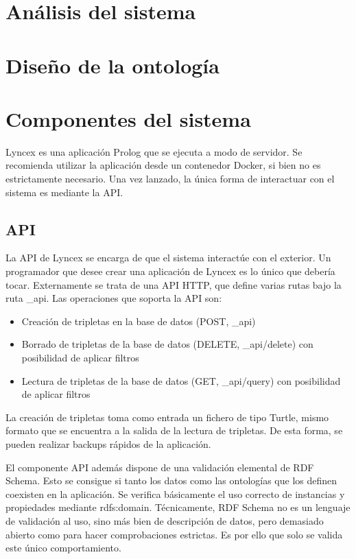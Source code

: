 \documentclass[12pt]{report} %
\begin{document}
\chapter{Análisis del sistema}

\chapter{Diseño de la ontología}

\chapter{Componentes del sistema}
Lyncex es una aplicación Prolog que se ejecuta a modo de servidor. Se recomienda utilizar la aplicación desde un contenedor Docker, si bien no es estrictamente necesario. 
Una vez lanzado, la única forma de interactuar con el sistema es mediante la API.

\section{API}
La API de Lyncex se encarga de que el sistema interactúe con el exterior.
Un programador que desee crear una aplicación de Lyncex es lo único que debería tocar.
Externamente se trata de una API HTTP, que define varias rutas bajo la ruta \_api.
Las operaciones que soporta la API son:
\begin{itemize}
    \item Creación de tripletas en la base de datos (POST, \_api)
    \item Borrado de tripletas de la base de datos (DELETE, \_api/delete) con posibilidad de aplicar filtros
    \item Lectura de tripletas de la base de datos (GET, \_api/query) con posibilidad de aplicar filtros
\end{itemize}

La creación de tripletas toma como entrada un fichero de tipo Turtle, mismo formato que se encuentra a la salida de la lectura de tripletas.
De esta forma, se pueden realizar backups rápidos de la aplicación.

El componente API además dispone de una validación elemental de RDF Schema.
Esto se consigue si tanto los datos como las ontologías que los definen coexisten en la aplicación.
Se verifica básicamente el uso correcto de instancias y propiedades mediante rdfs:domain.
Técnicamente, RDF Schema no es un lenguaje de validación al uso, sino más bien de descripción de datos, pero demasiado abierto como para hacer comprobaciones estrictas.
Es por ello que solo se valida este único comportamiento.
\end{document}
